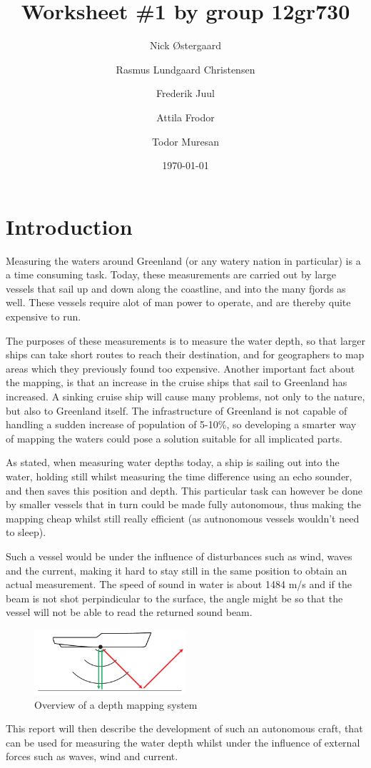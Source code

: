 \documentclass[a4paper,11pt,oneside,fleqn]{article}
\begin{document}
\author{Nick Østergaard \and Rasmus Lundgaard Christensen \and Frederik Juul \and Attila Frodor \and Todor Muresan}
\title{Worksheet \#1 by group 12gr730}
\date{\today}
\maketitle

\section{Introduction}
Measuring the waters around Greenland (or any watery nation in particular) is a a time consuming task. Today, these measurements are carried out by large vessels that sail up and down along the coastline, and into the many fjords as well. These vessels require alot of man power to operate, and are thereby quite expensive to run.

The purposes of these measurements is to measure the water depth, so that larger ships can take short routes to reach their destination, and for geographers to map areas which they previously found too expensive. Another important fact about the mapping, is that an increase in the cruise ships that sail to Greenland has increased. A sinking cruise ship will cause many problems, not only to the nature, but also to Greenland itself. The infrastructure of Greenland is not capable of handling a sudden increase of population of 5-10\%, so developing a smarter way of mapping the waters could pose a solution suitable for all implicated parts. 

As stated, when measuring water depths today, a ship is sailing out into the water, holding still whilst measuring the time difference using an echo sounder, and then saves this position and depth. This particular task can however be done by smaller vessels that in turn could be made fully autonomous, thus making the mapping cheap whilst still really efficient (as autnonomous vessels wouldn't need to sleep). 

Such a vessel would be under the influence of disturbances such as wind, waves and the current, making it hard to stay still in the same position to obtain an actual measurement. The speed of sound in water is about 1484 m/s and if the beam is not shot perpindicular to the surface, the angle might be so that the vessel will not be able to read the returned sound beam. 

\begin{figure}[h]
\centering
\includegraphics[width=0.5\textwidth]{img/beamer}
\caption{Overview of a depth mapping system}
\label{fig:beamer}
\end{figure}

This report will then describe the development of such an autonomous craft, that can be used for measuring the water depth whilst under the influence of external forces such as waves, wind and current. 
\end{document}
